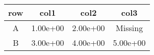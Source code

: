\begin{tabular}{cccc}
\toprule
row&col1&col2&col3\tabularnewline
\midrule
A&1.00e+00&2.00e+00& Missing\tabularnewline
B&3.00e+00&4.00e+00&5.00e+00\tabularnewline
\bottomrule
\end{tabular}
